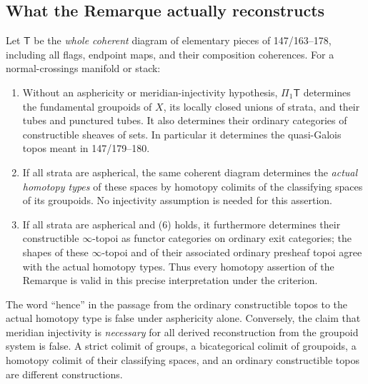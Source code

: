\subsection{What the Remarque actually reconstructs}

\begin{theorem}\label{P1c1}
Let $\mathsf T$ be the \emph{whole coherent} diagram of elementary pieces
of 147/163--178, including all flags, endpoint maps, and their composition
coherences.  For a normal-crossings manifold or stack:
\begin{enumerate}[label=(\alph*)]
\item Without an asphericity or meridian-injectivity hypothesis,
 $\Pi_1\mathsf T$ determines the fundamental groupoids of $X$, its
 locally closed unions of strata, and their tubes and punctured tubes.
 It also determines their ordinary categories of constructible sheaves
 of sets.  In particular it determines the quasi-Galois topos meant in
 147/179--180.
\item If all strata are aspherical, the same coherent diagram determines
 the \emph{actual homotopy types} of these spaces by homotopy colimits
 of the classifying spaces of its groupoids.  No injectivity assumption
 is needed for this assertion.
\item If all strata are aspherical and (6) holds, it furthermore
 determines their constructible $\infty$-topoi as functor categories on
 ordinary exit categories; the shapes of these $\infty$-topoi and of
 their associated ordinary presheaf topoi agree with the actual
 homotopy types.  Thus every homotopy assertion of the Remarque is
 valid in this precise interpretation under the criterion.
\end{enumerate}
The word ``hence'' in the passage from the ordinary constructible topos
to the actual homotopy type is false under asphericity alone.  Conversely,
the claim that meridian injectivity is \emph{necessary} for all derived
reconstruction from the groupoid system is false.  A strict colimit of
groups, a bicategorical colimit of groupoids, a homotopy colimit of their
classifying spaces, and an ordinary constructible topos are different
constructions.
\end{theorem}
